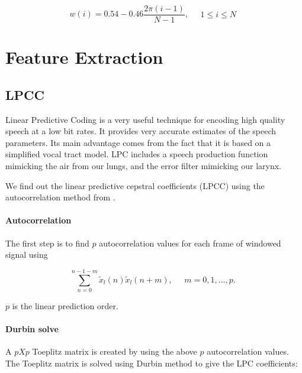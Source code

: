 \begin{equation*} w(i) = 0.54 - 0.46\frac{2\pi(i - 1)}{N - 1}, \quad \begin{aligned} 1 \leq i \leq N \end{aligned}
\end{equation*}

\chapter{Feature Extraction}
\section{LPCC}

Linear Predictive Coding is a very useful technique for encoding high quality speech at a low bit rates. It provides very accurate estimates of the speech parameters. Its main advantage comes from the fact that it is based on a simplified vocal tract model. LPC includes a speech production function mimicking the air from our lungs, and the error filter mimicking our larynx.

We find out the linear predictive cepstral coefficients (LPCC) using the autocorrelation method from \cite{rabinerbook}.

\subsubsection{Autocorrelation}
The first step is to find $p$ autocorrelation values for each frame of windowed signal using 

\begin{equation*} \sum_{n=0}^{n-1-m}{\tilde{x}_l(n)}{\tilde{x}_l(n+m)}, \quad \begin{aligned} m=0,1,...,p. \end{aligned} \end{equation*} 

$p$ is the linear prediction order.

\subsubsection{Durbin solve}
A $pXp$ Toeplitz matrix is created by using the above $p$ autocorrelation values. The Toeplitz matrix is solved using Durbin method to give the LPC coefficients:

